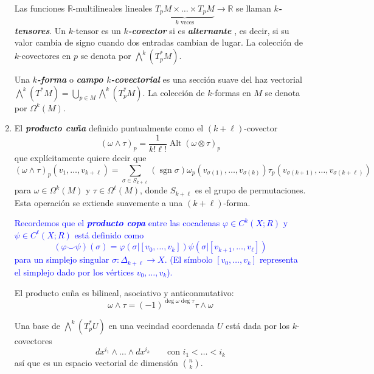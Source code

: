 \documentclass[spanish]{article}
\theoremstyle{definition}
\newcommand{\R}{\mathbb{R}}
\DeclareMathOperator{\sgn}{sgn}
\begin{document}
\begin{enumerate}
		Las funciones $\R$-multilineales lineales $\underbrace{T_pM\times\ldots\times T_pM}_{k\text{ veces}}\to \R$ se llaman \textbf{\textit{$k$-tensores}}. Un $k$-tensor es un \textbf{\textit{$k$-covector}} si es \textbf{\textit{alternante}}
		, es decir, si su valor cambia de signo cuando dos entradas cambian de lugar. La colección de $k$-covectores en $p$ se denota por $\bigwedge^k(T^*_pM)$.
		
		Una \textbf{\textit{$k$-forma}} o \textbf{\textit{campo $k$-covectorial}} es una
		sección suave del haz vectorial $\bigwedge^k(T^*M)=\bigcup_{p\in M}\bigwedge^k(T_p^*M)$.  La colección de $k$-formas en $M$ se denota por $\Omega^k(M)$.
		
		
		\item El \textbf{\textit{producto cuña}} definido puntualmente como el $(k+\ell)$-covector
		\[(\omega\wedge\tau)_p=\frac{1}{k!\ell!}\operatorname{Alt}(\omega\otimes\tau)_p\]
		que explícitamente quiere decir que
		\[(\omega\wedge\tau)_p(v_1,\ldots,v_{k+\ell})=\sum_{\sigma\in S_{k+\ell}}(\sgn\sigma)\omega_p(v_{\sigma(1)},\ldots,v_{\sigma(k)})\tau_p(v_{\sigma(k+1)},\ldots,v_{\sigma(k+\ell)})\]
		para $\omega\in\Omega^k(M)$ y $\tau\in\Omega^\ell(M)$, donde $S_{k+\ell}$ es el grupo de permutaciones. Esta operación se extiende suavemente a una $(k+\ell)$-forma.
		
		\textcolor{blue}{Recordemos que el \textbf{\textit{producto copa}} entre las cocadenas $\varphi\in C^k(X;R)$ y $\psi\in C^\ell(X;R)$ está definido como
			\[(\varphi\smile \psi)(\sigma)=\varphi(\sigma|[v_0,\ldots,v_k])\psi(\sigma|[v_{k+1},\ldots,v_{\ell}])\]
			para un simplejo singular $\sigma:\Delta_{k+\ell}\to X$. (El símbolo $[v_0,\ldots,v_k]$ representa el simplejo dado por los vértices $v_0,\ldots,v_k$).
		}
		
		El producto cuña es bilineal, asociativo y anticonmutativo:
		\[\omega\wedge\tau=(-1)^{\deg\omega\deg\tau}\tau\wedge\omega\]
		
		Una base de $\bigwedge^k(T_p^*U)$ en una vecindad coordenada $U$ está dada por los $k$-covectores
		\[dx^{i_1}\wedge\ldots\wedge dx^{i_k}\qquad \text{con }i_1<\ldots<i_k\]
		así que es un espacio vectorial de dimensión $\binom{n}{k}$.
		\iffalse
		Conviene pensar en estos objetos , para los 1-covectores $\omega^1,\ldots,\omega^k$ y los vectores $v_1,\ldots,v_k$,
		\[\omega^1\wedge\ldots\wedge\omega^k(v_1,\ldots,v_k)=\det(\omega^i(v_j))\]
		Por ejemplo, en $\R^2$, $dx\wedge dy\left(\begin{pmatrix}
			v^1\\
			v^2
		\end{pmatrix},\begin{pmatrix}
			w^1\\
			w^2
		\end{pmatrix}\right)=v^1w^2-v^2w^1$.\fi
		

\end{enumerate}
\end{document}
